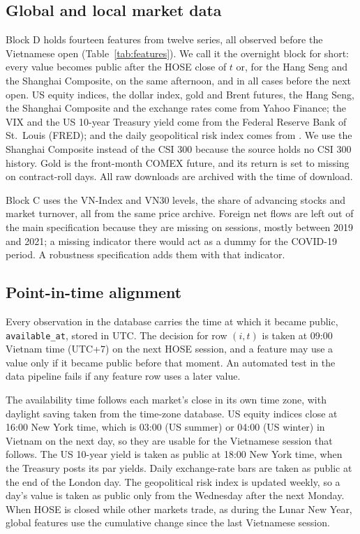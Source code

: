 \subsection{Global and local market data}\label{sec:global}

Block D holds fourteen features from twelve series, all observed before the Vietnamese open (Table~\ref{tab:features}).
We call it the overnight block for short: every value becomes public after the HOSE close of $t$ or,
for the Hang Seng and the Shanghai Composite, on the same afternoon, and in all cases before the
next open. US
equity indices, the dollar index, gold and Brent futures, the Hang Seng, the Shanghai Composite and
the exchange rates come from Yahoo Finance; the VIX and the US 10-year Treasury yield come from the
Federal Reserve Bank of St.\ Louis (FRED); and the daily geopolitical risk index comes from
\citet{CaldaraIacoviello2022}. We use the Shanghai Composite instead of the CSI 300 because the
source holds no CSI 300 history. Gold is the front-month COMEX future, and its return is set to
missing on contract-roll days. All raw downloads are archived with the time of download.

Block C uses the VN-Index and VN30 levels, the share of advancing stocks and market turnover, all from
the same price archive. Foreign net flows are left out of the main specification because they are
missing on  sessions, mostly between 2019 and 2021; a missing indicator
there would act as a dummy for the COVID-19 period. A robustness specification adds them with that
indicator.

\subsection{Point-in-time alignment}\label{sec:pit}

Every observation in the database carries the time at which it became public,
\texttt{available\_at}, stored in UTC. The decision for row $(i,t)$ is taken at 09:00 Vietnam time
(UTC+7) on the next HOSE session, and a feature may use a value only if it became public before that
moment. An automated test in the data pipeline fails if any feature row uses a later value.

The availability time follows each market's close in its own time zone, with daylight saving taken
from the time-zone database. US equity indices close at 16:00 New York time, which is 03:00 (US
summer) or 04:00 (US winter) in Vietnam on the next day, so they are usable for the Vietnamese session
that follows. The US 10-year yield is taken as public at 18:00 New York time, when the Treasury
posts its par yields. Daily exchange-rate bars are taken as public at the end of the London day. The
geopolitical risk index is updated weekly, so a day's value is taken as public only from the
Wednesday after the next Monday. When HOSE is closed while other markets trade, as during the Lunar
New Year, global features use the cumulative change since the last Vietnamese session.

